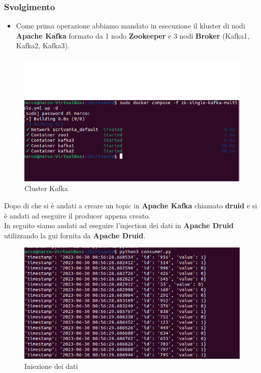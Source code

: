 \documentclass{article}
\begin{document}
\subsubsection{Svolgimento}
\begin{itemize}
    \item Come prima operazione abbiamo mandato in esecuzione il kluster di nodi \textbf{Apache Kafka} formato da 1 nodo \textbf{Zookeeper} e 3 nodi \textbf{Broker} (Kafka1, Kafka2, Kafka3).
\end{itemize}
\begin{figure}[h]
    \centering
    \includegraphics[scale=0.5]{images/kluster_producer.png}
    \caption{Cluster Kafka}
    \label{fig:my_label}
\end{figure}
Dopo di che si è andati a creare un topic in \textbf{Apache Kafka} chiamato \textbf{druid} e si è andati ad eseguire il producer appena creato.
\\In seguito siamo andati ad eseguire l'injection dei dati in \textbf{Apache Druid} utilizzando la gui fornita da \textbf{Apache Druid}.
\begin{figure}[H]
    \centering
    \includegraphics[scale=0.5]{images/consumer.png}
    \caption{Iniezione dei dati}
    \label{fig:my_label}
\end{figure} 
\end{document}
